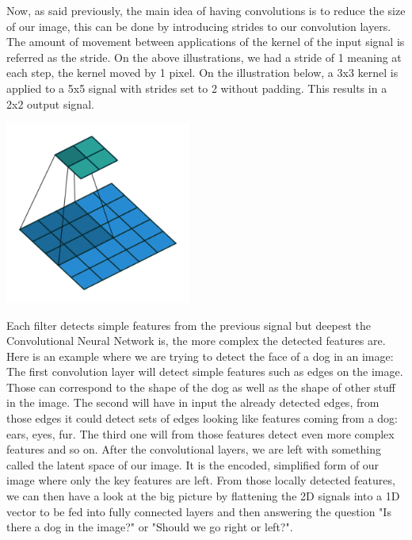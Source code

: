 \documentclass[12pt]{article}
\begin{document}
\newpage

Now, as said previously, the main idea of having convolutions is to reduce the size of our image, this can be done by introducing strides to our convolution layers. The amount of movement between applications of the kernel of the input signal is referred as the stride. On the above illustrations, we had a stride of 1 meaning at each step, the kernel moved by 1 pixel. On the illustration below, a 3x3 kernel is applied to a 5x5 signal with strides set to 2 without padding. This results in a 2x2 output signal. \\
\centerline{\includegraphics[height=6cm]{../../docs/strides.png}}

Each filter detects simple features from the previous signal but deepest the Convolutional Neural Network is, the more complex the detected features are. Here is an example where we are trying to detect the face of a dog in an image: 
The first convolution layer will detect simple features such as edges on the image. Those can correspond to the shape of the dog as well as the shape of other stuff in the image. The second will have in input the already detected edges, from those edges it could detect sets of edges looking like features coming from a dog: ears, eyes, fur. The third one will from those features detect even more complex features and so on.
After the convolutional layers, we are left with something called the latent space of our image. It is the encoded, simplified form of our image where only the key features are left. From those locally detected features, we can then have a look at the big picture by flattening the 2D signals into a 1D vector to be fed into fully connected layers and then answering the question "Is there a dog in the image?" or "Should we go right or left?". \\
\end{document}
